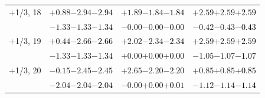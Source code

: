\documentclass[compress]{beamer}
\begin{document}
\begin{frame}
\begin{tabular}{r | c | c | c}
$+$1/3, 18 & $+0.88$\hspace{0.1 cm}$-2.94$\hspace{0.1 cm}\textcolor{black}{$-2.94$} & $+1.89$\hspace{0.1 cm}$-1.84$\hspace{0.1 cm}\textcolor{black}{$-1.84$} & $+2.59$\hspace{0.1 cm}$+2.59$\hspace{0.1 cm}\textcolor{black}{$+2.59$} \\
           & $-1.33$\hspace{0.1 cm}$-1.33$\hspace{0.1 cm}\textcolor{black}{$-1.34$} & $-0.00$\hspace{0.1 cm}$-0.00$\hspace{0.1 cm}\textcolor{black}{$-0.00$} & $-0.42$\hspace{0.1 cm}$-0.43$\hspace{0.1 cm}\textcolor{black}{$-0.43$} \\
$+$1/3, 19 & $+0.44$\hspace{0.1 cm}$-2.66$\hspace{0.1 cm}\textcolor{black}{$-2.66$} & $+2.02$\hspace{0.1 cm}$-2.34$\hspace{0.1 cm}\textcolor{black}{$-2.34$} & $+2.59$\hspace{0.1 cm}$+2.59$\hspace{0.1 cm}\textcolor{black}{$+2.59$} \\
           & $-1.33$\hspace{0.1 cm}$-1.33$\hspace{0.1 cm}\textcolor{black}{$-1.34$} & $+0.00$\hspace{0.1 cm}$+0.00$\hspace{0.1 cm}\textcolor{black}{$+0.00$} & $-1.05$\hspace{0.1 cm}$-1.07$\hspace{0.1 cm}\textcolor{black}{$-1.07$} \\
$+$1/3, 20 & $-0.15$\hspace{0.1 cm}$-2.45$\hspace{0.1 cm}\textcolor{black}{$-2.45$} & $+2.65$\hspace{0.1 cm}$-2.20$\hspace{0.1 cm}\textcolor{black}{$-2.20$} & $+0.85$\hspace{0.1 cm}$+0.85$\hspace{0.1 cm}\textcolor{black}{$+0.85$} \\
           & $-2.04$\hspace{0.1 cm}$-2.04$\hspace{0.1 cm}\textcolor{black}{$-2.04$} & $-0.00$\hspace{0.1 cm}$+0.00$\hspace{0.1 cm}\textcolor{black}{$+0.01$} & $-1.12$\hspace{0.1 cm}$-1.14$\hspace{0.1 cm}\textcolor{black}{$-1.14$} \\

\end{tabular}
\end{frame}
\end{document}
